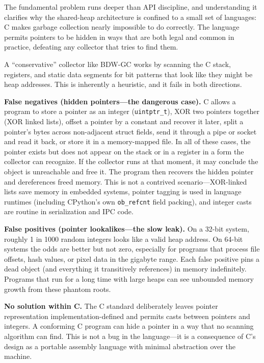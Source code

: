 \documentclass[11pt]{article}
\begin{document}
The fundamental problem runs deeper than API discipline, and
understanding it clarifies why the shared-heap architecture is confined
to a small set of languages: C makes garbage collection nearly
impossible to do correctly.  The language permits pointers to be hidden
in ways that are both legal and common in practice, defeating any
collector that tries to find them.

A ``conservative'' collector like BDW-GC works by scanning the C
stack, registers, and static data segments for bit patterns that look
like they might be heap addresses.  This is inherently a heuristic,
and it fails in both directions.

\textbf{False negatives (hidden pointers---the dangerous case).}  C
allows a program to store a pointer as an integer
(\texttt{uintptr\_t}), XOR two pointers together (XOR linked lists),
offset a pointer by a constant and recover it later, split a pointer's
bytes across non-adjacent struct fields, send it through a pipe or
socket and read it back, or store it in a memory-mapped file.  In all
of these cases, the pointer exists but does not appear on the stack or
in a register in a form the collector can recognize.  If the collector
runs at that moment, it may conclude the object is unreachable and
free it.  The program then recovers the hidden pointer and
dereferences freed memory.  This is not a contrived scenario---XOR-linked
lists save memory in embedded systems, pointer tagging is used in
language runtimes (including CPython's own \texttt{ob\_refcnt} field
packing), and integer casts are routine in serialization and IPC code.

\textbf{False positives (pointer lookalikes---the slow leak).}  On a
32-bit system, roughly 1 in 1000 random integers looks like a valid
heap address.  On 64-bit systems the odds are better but not zero,
especially for programs that process file offsets, hash values, or
pixel data in the gigabyte range.  Each false positive pins a dead
object (and everything it transitively references) in memory
indefinitely.  Programs that run for a long time with large heaps can
see unbounded memory growth from these phantom roots.

\textbf{No solution within C.}  The C standard deliberately leaves
pointer representation implementation-defined and permits casts
between pointers and integers.  A conforming C program can hide a
pointer in a way that no scanning algorithm can find.  This is not a
bug in the language---it is a consequence of C's design as a portable
assembly language with minimal abstraction over the machine.
\end{document}
